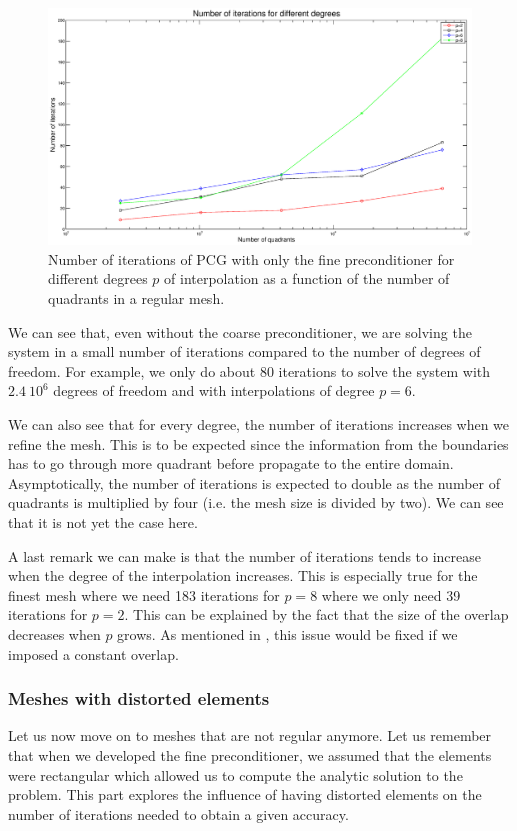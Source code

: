 \begin{figure}
\centering
\includegraphics[scale=0.35]{Results/fine_reg_iter.eps}
\caption{Number of iterations of PCG with only the fine preconditioner for different degrees $p$ of interpolation as a function of the number of quadrants in a regular mesh.}
\label{fine_reg_iter} 
\end{figure}

We can see that, even without the coarse preconditioner, we are solving the system in a small number of iterations compared to the number of degrees of freedom. For example, we only do about 80 iterations to solve the system with $2.4\: 10^{6}$ degrees of freedom and with interpolations of degree $p=6$. 

 We can also see that for every degree, the number of iterations increases when we refine the mesh. This is to be expected since the information from the boundaries has to go through more quadrant before propagate to the entire domain. Asymptotically, the number of iterations is expected to double as the number of quadrants is multiplied by four (i.e. the mesh size is divided by two). We can see that it is not yet the case here.

A last remark we can make is that the number of iterations tends to increase when the degree of the interpolation increases. This is especially true for the finest mesh where we need 183 iterations for $p=8$ where we only need 39 iterations for $p=2$. This can be explained by the fact that the size of the overlap decreases when $p$ grows. As mentioned in \cite{overlap_constant}, this issue would be fixed if we imposed a constant overlap.

\subsubsection{Meshes with distorted elements}
Let us now move on to meshes that are not regular anymore. Let us remember that when we developed the fine preconditioner, we assumed that the elements were rectangular which allowed us to compute the analytic solution to the problem. This part explores the influence of having distorted elements on the number of iterations needed to obtain a given accuracy. 

